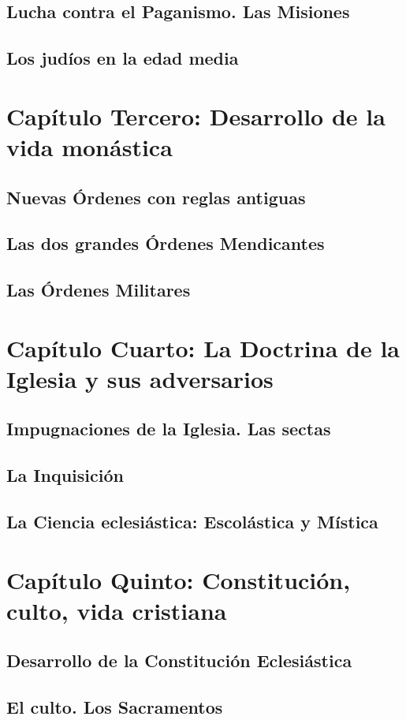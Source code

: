 \raggedbottom{} \documentclass[12pt, a4paper, openany]{book} %
\begin{document}
\section{Lucha contra el Paganismo. Las Misiones}
\section{Los judíos en la edad media}
\chapter{Capítulo Tercero: Desarrollo de la vida monástica}
\section{Nuevas Órdenes con reglas antiguas}
\section{Las dos grandes Órdenes Mendicantes}
\section{Las Órdenes Militares}
\chapter{Capítulo Cuarto: La Doctrina de la Iglesia y sus adversarios}
\section{Impugnaciones de la Iglesia. Las sectas}
\section{La Inquisición}
\section{La Ciencia eclesiástica: Escolástica y Mística}
\chapter{Capítulo Quinto: Constitución, culto, vida cristiana}
\section{Desarrollo de la Constitución Eclesiástica}
\section{El culto. Los Sacramentos}
\end{document}
